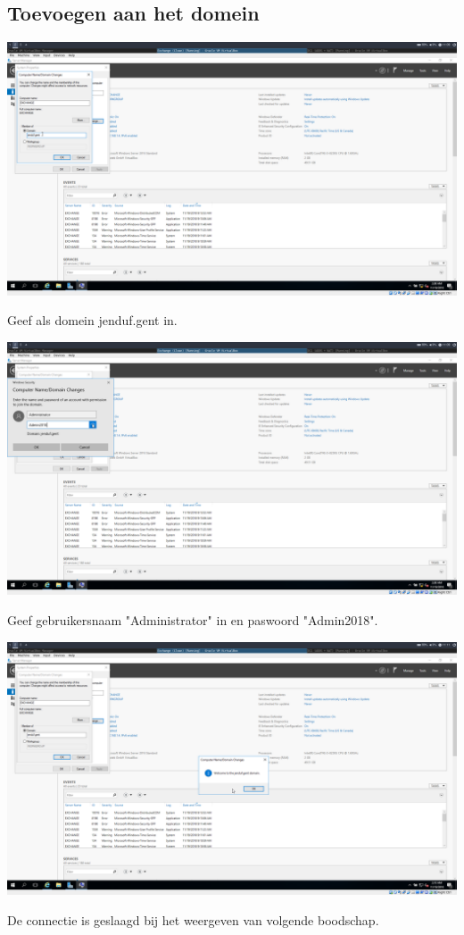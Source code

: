 \documentclass[a4paper]{article}
\begin{document}
\subsection{Toevoegen aan het domein}
\begin{center}
	\includegraphics[width=15cm]{Pictures/Exchange/1542622164.png}
	
	Geef als domein jenduf.gent in.
\end{center}
\begin{center}
	\includegraphics[width=15cm]{Pictures/Exchange/1542622176.png}
	
	Geef gebruikersnaam "Administrator" in en paswoord "Admin2018".
\end{center}
\begin{center}
	\includegraphics[width=15cm]{Pictures/Exchange/1542622272.png}
	
	De connectie is geslaagd bij het weergeven van volgende boodschap.
\end{center}
\end{document}
